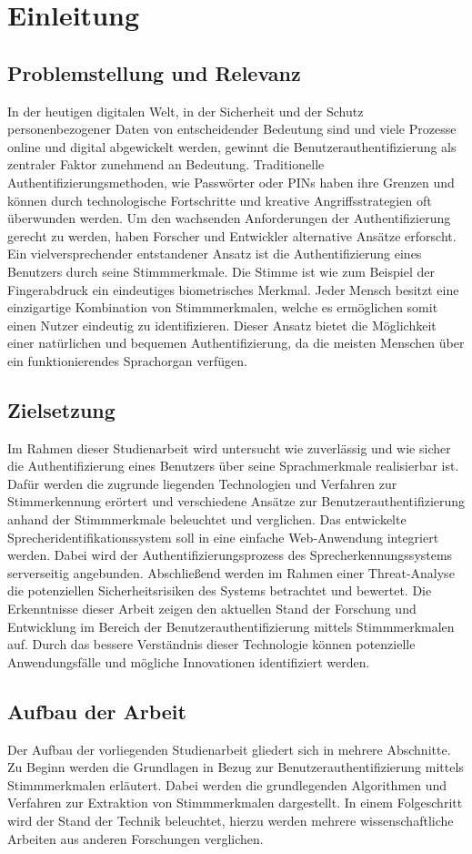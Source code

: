 \section{Einleitung}
\subsection{Problemstellung und Relevanz}
In der heutigen digitalen Welt, in der Sicherheit und der Schutz personenbezogener Daten von entscheidender Bedeutung sind und viele Prozesse online und digital abgewickelt werden, gewinnt die Benutzerauthentifizierung als zentraler Faktor zunehmend an Bedeutung.
Traditionelle Authentifizierungsmethoden, wie Passwörter oder PINs haben ihre Grenzen und können durch technologische Fortschritte und kreative Angriffsstrategien oft überwunden werden.
Um den wachsenden Anforderungen der Authentifizierung gerecht zu werden, haben Forscher und Entwickler alternative Ansätze erforscht.
\newparagraph
Ein vielversprechender entstandener Ansatz ist die Authentifizierung eines Benutzers durch seine Stimmmerkmale.
Die Stimme ist wie zum Beispiel der Fingerabdruck ein eindeutiges biometrisches Merkmal.
Jeder Mensch besitzt eine einzigartige Kombination von Stimmmerkmalen, welche es ermöglichen somit einen Nutzer eindeutig zu identifizieren.
Dieser Ansatz bietet die Möglichkeit einer natürlichen und bequemen Authentifizierung, da die meisten Menschen über ein funktionierendes Sprachorgan verfügen.

\subsection{Zielsetzung}
Im Rahmen dieser Studienarbeit wird untersucht wie zuverlässig und wie sicher die Authentifizierung eines Benutzers über seine Sprachmerkmale realisierbar ist.
Dafür werden die zugrunde liegenden Technologien und Verfahren zur Stimmerkennung erörtert und verschiedene Ansätze zur Benutzerauthentifizierung anhand der Stimmmerkmale beleuchtet und verglichen.
Das entwickelte Sprecheridentifikationssystem soll in eine einfache Web-Anwendung integriert werden.
Dabei wird der Authentifizierungsprozess des Sprecherkennungssystems serverseitig angebunden.
Abschließend werden im Rahmen einer Threat-Analyse die potenziellen Sicherheitsrisiken des Systems betrachtet und bewertet.
\newparagraph
Die Erkenntnisse dieser Arbeit zeigen den aktuellen Stand der Forschung und Entwicklung im Bereich der Benutzerauthentifizierung mittels Stimmmerkmalen auf.
Durch das bessere Verständnis dieser Technologie können potenzielle Anwendungsfälle und mögliche Innovationen identifiziert werden.

\subsection{Aufbau der Arbeit}
Der Aufbau der vorliegenden Studienarbeit gliedert sich in mehrere Abschnitte.
Zu Beginn werden die Grundlagen in Bezug zur Benutzerauthentifizierung mittels Stimmmerkmalen erläutert.
Dabei werden die grundlegenden Algorithmen und Verfahren zur Extraktion von Stimmmerkmalen dargestellt.
In einem Folgeschritt wird der Stand der Technik beleuchtet, hierzu werden mehrere wissenschaftliche Arbeiten aus anderen Forschungen verglichen.
